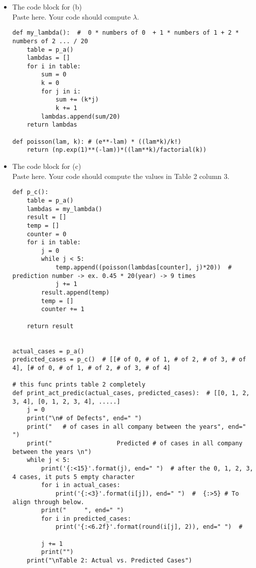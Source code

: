 \documentclass[a4 paper]{article}
\numberwithin{equation}{section}
\newcommand{\0}{\mathbf{0}}
\begin{document}
\begin{itemize}
		\item The code block for (b)\\
		Paste here. Your code should compute $\lambda$.
		
		\begin{lstlisting}
def my_lambda():  #  0 * numbers of 0  + 1 * numbers of 1 + 2 * numbers of 2 ... / 20
    table = p_a()
    lambdas = []
    for i in table:
        sum = 0
        k = 0
        for j in i:
            sum += (k*j)
            k += 1
        lambdas.append(sum/20)
    return lambdas

def poisson(lam, k): # (e**-lam) * ((lam*k)/k!)
    return (np.exp(1)**(-lam))*((lam**k)/factorial(k))
		\end{lstlisting}
		
		\item The code block for (c)\\
		Paste here. Your code should compute the values in Table 2 column 3.
		
		\begin{lstlisting}
def p_c():
    table = p_a()
    lambdas = my_lambda()
    result = []
    temp = []
    counter = 0
    for i in table:
        j = 0
        while j < 5:
            temp.append((poisson(lambdas[counter], j)*20))  #  prediction number -> ex. 0.45 * 20(year) -> 9 times
            j += 1
        result.append(temp)
        temp = []
        counter += 1
    
    return result


actual_cases = p_a()
predicted_cases = p_c()  # [[# of 0, # of 1, # of 2, # of 3, # of 4], [# of 0, # of 1, # of 2, # of 3, # of 4]

# this func prints table 2 completely
def print_act_predic(actual_cases, predicted_cases):  # [[0, 1, 2, 3, 4], [0, 1, 2, 3, 4], .....]
    j = 0
    print("\n# of Defects", end=" ")
    print("   # of cases in all company between the years", end=" ")
    print("                  Predicted # of cases in all company between the years \n")
    while j < 5:
        print('{:<15}'.format(j), end=" ")  # after the 0, 1, 2, 3, 4 cases, it puts 5 empty character
        for i in actual_cases:
            print('{:<3}'.format(i[j]), end=" ")  #  {:>5} # To align through below.
        print("     ", end=" ")
        for i in predicted_cases:
            print('{:<6.2f}'.format(round(i[j], 2)), end=" ")  #
        
        j += 1
        print("")
    print("\nTable 2: Actual vs. Predicted Cases")
		\end{lstlisting}
		

\end{itemize}
\end{document}
